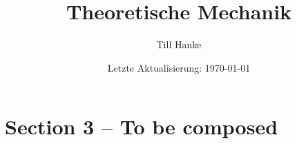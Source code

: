 \documentclass{scrartcl}
\begin{document}
\title{Theoretische Mechanik}
\author{Till Hanke}
\date{Letzte Aktualisierung: \today}

\maketitle
\tableofcontents



\section{Section 3 -- To be composed}



\end{document}
